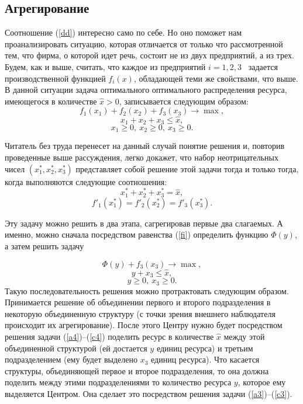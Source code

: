\subsection {Агрегирование}

Соотношение (\ref{dd}) интересно само по себе. Но оно поможет нам
проанализировать ситуацию, которая отличается от только что
рассмотренной тем, что фирма, о которой идет речь, состоит не из
двух предприятий, а из трех. Будем, как и выше, считать, что каждое
из предприятий $i=1,2,3$ \ задается производственной функцией
$f_{i}(x)$, обладающей теми же свойствами, что выше. В данной
ситуации задача оптимального оптимального распределения ресурса,
имеющегося в количестве $\hat{x}>0$, записывается следующим образом:
\begin{equation}
\label{a3} f_{1}(x_{1})+f_{2}(x_{2})+f_{3}(x_{3})\rightarrow\max,
\end{equation}
\begin{equation}
\label{b3}
 x_{1}+x_{2}+x_{3}\leqslant\hat{x},
\end{equation}
\begin{equation}
\label{c3}
 x_{1}\geqslant0,\ x_{2}\geqslant0,\ x_{3}\geqslant0.
\end{equation}

Читатель без труда перенесет на данный случай понятие решения и,
повторив проведенные выше рассуждения, легко докажет, что набор
неотрицательных чисел
 $(x_{1}^{*},x_{2}^{*},x_{3}^{*})$
 представляет собой решение этой задачи тогда и только тогда, когда
 выполняются следующие соотношения:
 \[x_{1}^{*}+x_{2}^{*}+x_{3}^{*}=\hat{x},\]
 \[f'_{1}(x_{1}^{*})=f'_{2}(x_{2}^{*})=f'_{3}(x_{3}^{*}).\]

Эту задачу можно решить в два этапа, сагрегировав первые два
слагаемых. А именно, можно сначала посредством равенства (\ref{fi})
определить функцию $\Phi(y)$, а затем решить задачу


\begin{equation}
\label{a4}
 \Phi(y)+f_{3}(x_{3})\rightarrow\max,
\end{equation}
\begin{equation}
\label{b4}
 y+x_{3}\leqslant\hat{x},
\end{equation}
\begin{equation}
\label{c4}
 y\geqslant0,\ x_{3}\geqslant0.
\end{equation}
 Такую последовательность решения можно протрактовать следующим
 образом. Принимается решение об объединении первого и второго
 подразделения в некоторую объединенную структуру (с точки зрения
 внешнего наблюдателя происходит их агрегирование). После этого
 Центру
 нужно будет посредством решения задачи (\ref{a4})--(\ref{c4}) поделить
 ресурс в количестве $\hat{x}$  между этой объединенной
 структурой (ей достается $y$ единиц ресурса) и третьим
 подразделением (ему будет выделено $x_{3}$ единиц ресурса).
 Что касается структуры, объединяющей первое и второе подразделения,
 то она должна поделить между этими подразделениями то количество ресурса
 $y$, которое ему выделяется Центром. Она сделает это посредством
 решения задачи (\ref{a3})--(\ref{c3}).


